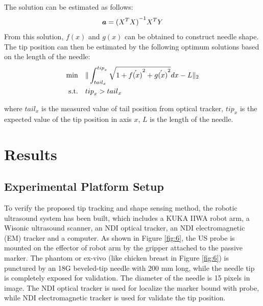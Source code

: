 \documentclass[journal,article,submit,moreauthors,pdftex]{Definitions/mdpi}
\begin{document}
The solution can be estimated as follows:
\begin{equation}
	{\textbf{\textit{a}}}={(X^T X)}^{-1} X^T  Y
\end{equation}
From this solution, ${f(x)}$ and ${g(x)}$ can be obtained to construct needle shape. The tip position can then be estimated by the following optimum solutions based on the length of the needle:
\begin{equation}
	\centering
	\begin{aligned}
		\textrm{min} \quad  & \|\int_{{tail}_x}^{{tip}_x}\sqrt{1+{\acute{f(x)}}^2+{\acute{g(x)}}^2 }dx-L\|_2 \\
		\textrm{s.t.} \quad & {tip}_x>{tail}_x                                                               \\
	\end{aligned}
\end{equation}

where ${{tail}_x}$ is the measured value of tail position from optical tracker, ${{tip}_x}$ is the expected value of the tip position in axis ${x}$, ${L}$ is the length of the needle.

\section{Results}
\subsection{Experimental Platform Setup}
To verify the proposed tip tracking and shape sensing method, the robotic ultrasound system has been built, which includes a KUKA IIWA robot arm, a Wisonic ultrasound scanner, an NDI optical tracker, an NDI electromagnetic (EM) tracker and a computer. As shown in Figure \ref{fig:6}, the US probe is mounted on the effector of robot arm by the gripper attached to the passive marker. The phantom or ex-vivo (like chicken breast in Figure \ref{fig:6}) is punctured by an 18G beveled-tip needle with 200 mm long, while the needle tip is completely exposed for validation.
The diameter of the needle is 15 pixels in image.
The NDI optical tracker is used for localize the marker bound with probe, while NDI electromagnetic tracker is used for validate the tip position.
\end{document}
